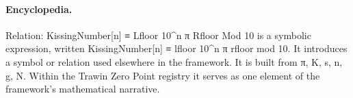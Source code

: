 \paragraph{Encyclopedia.}
Relation: KissingNumber[n] ≡ Lfloor 10\textasciicircum{}n π Rfloor Mod 10 is a symbolic expression, written KissingNumber[n] ≡ lfloor 10\textasciicircum{}n π rfloor mod 10. It introduces a symbol or relation used elsewhere in the framework. It is built from π, K, s, n, g, N. Within the Trawin Zero Point registry it serves as one element of the framework's mathematical narrative.
